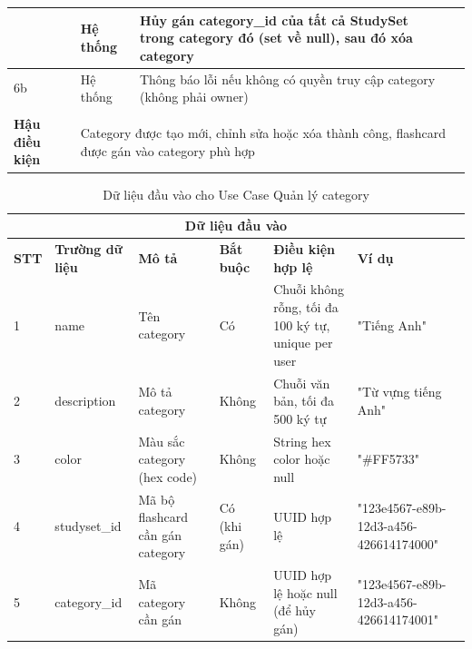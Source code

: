 \documentclass[../DoAn.tex]{subfiles}
\begin{document}
\begin{longtable}{|m{5cm}|m{2cm}|m{3cm}|m{3cm}|}
{\begin{tabular}{|m{1cm}|m{2cm}|m{4.7cm}|}
        \hline
        3a.1 & Hệ thống & Hủy gán category\_id của tất cả StudySet trong category đó (set về null), sau đó xóa category \\
        \hline
        6b & Hệ thống & Thông báo lỗi nếu không có quyền truy cập category (không phải owner) \\
        \hline
    \end{tabular}} \\
    \hline
    \multicolumn{1}{|m{4cm}|}{\textbf{Hậu điều kiện}} & \multicolumn{3}{|m{9cm}|}{Category được tạo mới, chỉnh sửa hoặc xóa thành công, flashcard được gán vào category phù hợp} \\
    \hline
\end{longtable}

\vspace{0.5cm}

\begin{table}[h!]
\centering
\begin{tabular}{|m{1cm}|m{2.5cm}|m{3cm}|m{1cm}|m{2.5cm}|m{3.5cm}|}
    \hline
    \multicolumn{6}{|c|}{\textbf{Dữ liệu đầu vào}} \\
    \hline
    \textbf{STT} & \textbf{Trường dữ liệu} & \textbf{Mô tả} & \textbf{Bắt buộc} & \textbf{Điều kiện hợp lệ} & \textbf{Ví dụ} \\
    \hline
    1 & name & Tên category & Có & Chuỗi không rỗng, tối đa 100 ký tự, unique per user & "Tiếng Anh" \\
    \hline
    2 & description & Mô tả category & Không & Chuỗi văn bản, tối đa 500 ký tự & "Từ vựng tiếng Anh" \\
    \hline
    3 & color & Màu sắc category (hex code) & Không & String hex color hoặc null & "\#FF5733" \\
    \hline
    4 & studyset\_id & Mã bộ flashcard cần gán category & Có (khi gán) & UUID hợp lệ & "123e4567-e89b-12d3-a456-426614174000" \\
    \hline
    5 & category\_id & Mã category cần gán & Không & UUID hợp lệ hoặc null (để hủy gán) & "123e4567-e89b-12d3-a456-426614174001" \\
    \hline
\end{tabular}
\caption{Dữ liệu đầu vào cho Use Case Quản lý category}
\end{table}

\vspace{0.5cm}
\end{document}
